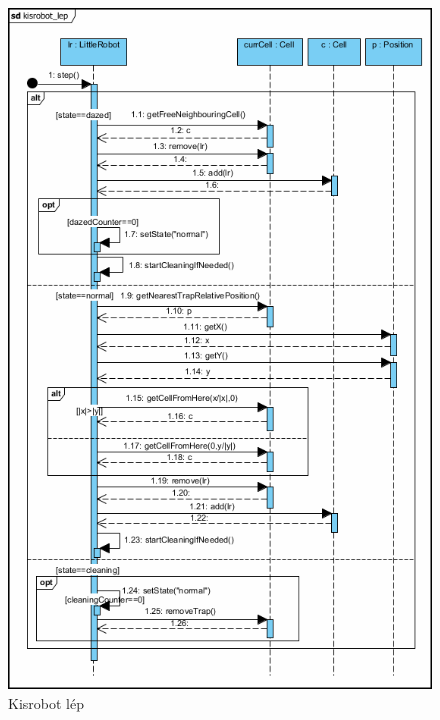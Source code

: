 \clearpage


\begin{figure}[h]
	\begin{center}
		\includegraphics[width=15cm]{chapters/chapter01/kisrobot_lep.png}
		\caption{Kisrobot lép}
		\label{fig:SzkeletonUseCase}
	\end{center}
\end{figure}

\clearpage


